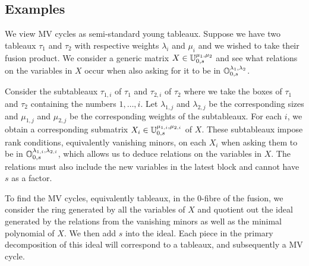 \documentclass[draft]{article}
\begin{document}
\subsection{Examples}


We view MV cycles as semi-standard young tableaux. Suppose we have two tableaux $\tau_1$ and $\tau_2$ with respective weights $\lambda_i$ and $\mu_i$ and we wished to take their fusion product. We consider a generic matrix $X \in \mathbb U^{\mu_1,\mu_2}_{0,s}$ and see what relations on the variables in $X$ occur when also asking for it to be in $\mathbb O^{\lambda_1,\lambda_2}_{0,s}$. 

Consider the subtableaux $\tau_{1,i}$ of $\tau_1$ and $\tau_{2,i}$ of $\tau_2$ where we take the boxes of $\tau_1$ and $\tau_2$ containing the numbers $1,\dots,i$. Let $\lambda_{1,j}$ and $\lambda_{2,j}$ be the corresponding sizes and $\mu_{1,j}$ and $\mu_{2,j}$ be the corresponding weights of the subtableaux. For each $i$, we obtain a corresponding submatrix $X_i \in \mathbb U^{\mu_{1,i}, \mu_{2,i}}_{0,s}$ of $X$. These subtableaux impose rank conditions, equivalently vanishing minors, on each $X_i$ when asking them to be in $\mathbb O^{\lambda_{1,i}, \lambda_{2,i}}_{0,s}$, which allows us to deduce relations on the variables in $X$. The relations must also include the new variables in the latest block and cannot have $s$ as a factor.

To find the MV cycles, equivalently tableaux, in the $0$-fibre of the fusion, we consider the ring generated by all the variables of $X$ and quotient out the ideal generated by the relations from the vanishing minors as well as the minimal polynomial of $X$. We then add $s$ into the ideal. Each piece in the primary decomposition of this ideal will correspond to a tableaux, and subsequently a MV cycle.
\end{document}
